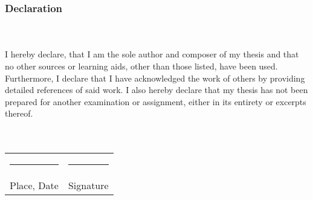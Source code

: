 \subsubsection{Declaration}\hfill\\\\
\noindent I hereby declare, that I am the sole author and composer of my thesis and that no other sources or learning aids, other than those listed, have been used. 
Furthermore, I declare that I have acknowledged the work of others by providing detailed references of said work.  \newline
I also hereby declare that my thesis has not been prepared for another examination or assignment, either in its entirety or excerpts thereof. 
\\
\\
\\
\begin{tabular}{p{} l}
  \rule{\textwidth/3}{0.4pt}   &   \rule{\textwidth/3}{0.4pt} \\
  Place, Date                  &   Signature
\end{tabular}